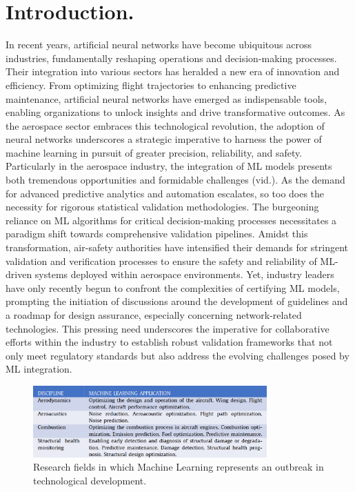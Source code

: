 \chapter{Introduction.}
%
\indent In recent years, artificial neural networks have become ubiquitous across industries, fundamentally reshaping operations and decision-making processes. Their integration into various sectors has heralded a new era of innovation and efficiency. From optimizing flight trajectories\cite{xu2023machine} to enhancing predictive maintenance\cite{shukla2020opportunities,adhikari2018machine,korvesis2017machine}, artificial neural networks have emerged as indispensable tools, enabling organizations to unlock insights and drive transformative outcomes. As the aerospace sector embraces this technological revolution, the adoption of neural networks underscores a strategic imperative to harness the power of machine learning in pursuit of greater precision, reliability, and safety. Particularly in the aerospace industry, the integration of ML models presents both tremendous opportunities and formidable challenges (vid.). As the demand for advanced predictive analytics and automation escalates, so too does the necessity for rigorous statistical validation methodologies. The burgeoning reliance on ML algorithms for critical decision-making processes necessitates a paradigm shift towards comprehensive validation pipelines. Amidst this transformation, air-safety authorities have intensified their demands for stringent validation and verification processes\cite{force2021concepts,roadmap2021easa} to ensure the safety and reliability of ML-driven systems deployed within aerospace environments. Yet, industry leaders have only recently begun to confront the complexities of certifying ML models\cite{henderson2022toward,durand2023formal,dmitriev2021toward,el2022certification,paul2023assurance}, prompting the initiation of discussions around the development of guidelines and a roadmap for design assurance, especially concerning network-related technologies. This pressing need underscores the imperative for collaborative efforts within the industry to establish robust validation frameworks that not only meet regulatory standards but also address the evolving challenges posed by ML integration.\\
\begin{figure}[!htb]
	\centering
	\includegraphics[width=0.8\textwidth]{Figures/ml_applications.png}
	\caption{Research fields in which Machine Learning represents an outbreak in technological development. \cite{le2023improving}}
\end{figure}


